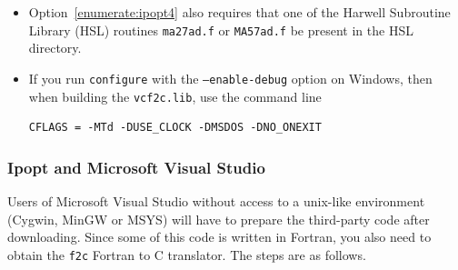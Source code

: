 \documentclass[11pt]{article}
\renewcommand{\_}{{\char"5F}}
\renewcommand{\{}{{\char"7B}}
\renewcommand{\}}{{\char"7D}}
\renewcommand{\^}{{\char"0D}}
\renewcommand{\'}{{\char"0D}}
\newif\ifipopt  \ipopttrue      %
\begin{document}
\begin{itemize}
\item Option~\ref{enumerate:ipopt4} also requires that one of the Harwell Subroutine Library (HSL) routines
{\tt ma27ad.f} or {\tt MA57ad.f} be present in the HSL directory.

\item If you run {\tt configure} with the {\tt --enable-debug} option on Windows, then when building the {\tt vcf2c.lib}, use the command line

\begin{verbatim}
CFLAGS = -MTd -DUSE_CLOCK -DMSDOS -DNO_ONEXIT
\end{verbatim}

\end{itemize}

\vskip 8pt

\ifipopt
\subsubsection{Ipopt and Microsoft Visual Studio} \label{section:ipopt-msvs}

Users of Microsoft Visual Studio without access to a unix-like environment (Cygwin, MinGW or MSYS)
will have to prepare the third-party code after downloading. Since some of this code is written in Fortran,
you also need to obtain the {\tt f2c} Fortran to C translator. The steps are as follows.
\end{document}
